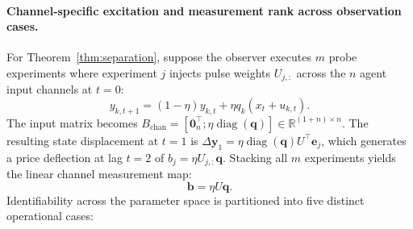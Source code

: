 \documentclass[10pt,twocolumn,letterpaper]{article}
\theoremstyle{definition}
\theoremstyle{remark}
\begin{document}
\paragraph{Channel-specific excitation and measurement rank across observation cases.}
For Theorem~\ref{thm:separation}, suppose the observer executes $m$ probe experiments where experiment $j$ injects pulse weights $U_{j,:}$ across the $n$ agent input channels at $t=0$:
\begin{equation}
 y_{k,t+1}=(1-\eta)y_{k,t}+\eta q_k(x_t+u_{k,t}).
\end{equation}
The input matrix becomes $B_{\mathrm{chan}}=[\mathbf0_n^\top; \eta\operatorname{diag}(\mathbf{q})]\in\mathbb{R}^{(1+n)\times n}$. The resulting state displacement at $t=1$ is $\Delta \mathbf{y}_1 = \eta \operatorname{diag}(\mathbf{q}) U^\top \mathbf{e}_j$, which generates a price deflection at lag $t=2$ of $b_j = \eta U_{j,:} \mathbf{q}$. Stacking all $m$ experiments yields the linear channel measurement map:
\begin{equation}
 \mathbf{b} = \eta U \mathbf{q}.
\end{equation}
Identifiability across the parameter space is partitioned into five distinct operational cases:
\end{document}
